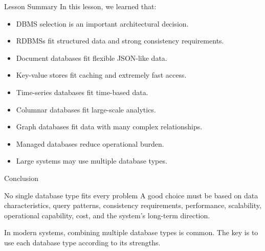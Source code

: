 \documentclass[aspectratio=169,11pt]{beamer}
\newcommand{\smallitem}{\setlength{\itemsep}{2pt}\setlength{\parskip}{0pt}}
\begin{document}
\begin{frame}{Lesson Summary}
In this lesson, we learned that:
\begin{itemize}
  \smallitem
  \item DBMS selection is an important architectural decision.
  \item RDBMSs fit structured data and strong consistency requirements.
  \item Document databases fit flexible JSON-like data.
  \item Key-value stores fit caching and extremely fast access.
  \item Time-series databases fit time-based data.
  \item Columnar databases fit large-scale analytics.
  \item Graph databases fit data with many complex relationships.
  \item Managed databases reduce operational burden.
  \item Large systems may use multiple database types.
\end{itemize}
\end{frame}

\begin{frame}{Conclusion}
\begin{block}{No single database type fits every problem}
A good choice must be based on data characteristics, query patterns, consistency requirements, performance, scalability, operational capability, cost, and the system's long-term direction.
\end{block}

\vspace{2mm}
In modern systems, combining multiple database types is common. The key is to use each database type according to its strengths.
\end{frame}
\end{document}
